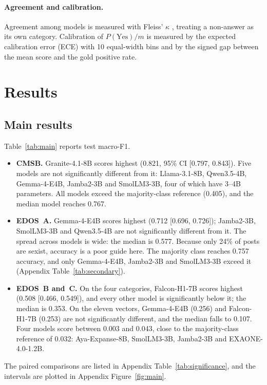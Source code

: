 \documentclass[11pt]{article}
\newcommand{\tbl}[1]{}
\begin{document}
\paragraph{Agreement and calibration.} Agreement among models is measured with Fleiss' $\kappa$ \citep{fleiss1971}, treating a non-answer as its own category. Calibration of $P(\text{Yes})/m$ is measured by the expected calibration error (ECE) with 10 equal-width bins \citep{guo2017calibration} and by the signed gap between the mean score and the gold positive rate.

\section{Results}\label{sec:results}

\subsection{Main results}
\tbl{main}

Table~\ref{tab:main} reports test macro-F1.
\begin{itemize}
  \item \textbf{CMSB.} Granite-4.1-8B scores highest (0.821, 95\% CI [0.797, 0.843]). Five models are not significantly different from it: Llama-3.1-8B, Qwen3.5-4B, Gemma-4-E4B, Jamba2-3B and SmolLM3-3B, four of which have 3--4B parameters. All models exceed the majority-class reference (0.405), and the median model reaches 0.767.
  \item \textbf{EDOS~A.} Gemma-4-E4B scores highest (0.712 [0.696, 0.726]); Jamba2-3B, SmolLM3-3B and Qwen3.5-4B are not significantly different from it. The spread across models is wide: the median is 0.577. Because only 24\% of posts are sexist, accuracy is a poor guide here. The majority class reaches 0.757 accuracy, and only Gemma-4-E4B, Jamba2-3B and SmolLM3-3B exceed it (Appendix Table~\ref{tab:secondary}).
  \item \textbf{EDOS~B and~C.} On the four categories, Falcon-H1-7B scores highest (0.508 [0.466, 0.549]), and every other model is significantly below it; the median is 0.353. On the eleven vectors, Gemma-4-E4B (0.256) and Falcon-H1-7B (0.253) are not significantly different, and the median falls to 0.107. Four models score between 0.003 and 0.043, close to the majority-class reference of 0.032: Aya-Expanse-8B, SmolLM3-3B, Jamba2-3B and EXAONE-4.0-1.2B.
\end{itemize}
The paired comparisons are listed in Appendix Table~\ref{tab:significance}, and the intervals are plotted in Appendix Figure~\ref{fig:main}.
\end{document}
